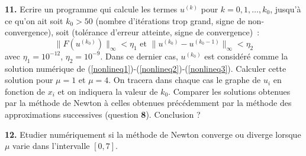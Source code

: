 \documentclass[a4paper,10pt]{article}
\begin{document}
\vspace{1ex}

\noindent
{\bf 11.} Ecrire un programme qui calcule les termes $u^{(k)}$ pour $k=0,1,\ldots , k_0$, jusqu'\`a ce qu'on ait soit $k_0 > 50$ 
(nombre d'it\'erations trop grand, signe de non-convergence), soit (tol\'erance d'erreur atteinte, signe de convergence)~:
$$
\| F(u^{(k_0)})   \|_\infty < \eta_1
 \mbox{~et~} \| u^{(k_0)} - u^{(k_0 -1)} \|_\infty < \eta_2
$$
avec $\eta_1 = 10^{-12}$, $\eta_2 = 10^{-9}$.
Dans ce dernier cas, $u^{(k_0)}$ est consid\'er\'e comme la solution num\'erique de (\ref{nonlineq1})-(\ref{nonlineq2})-(\ref{nonlineq3}).
Calculer cette solution pour $\mu =1$ et $\mu =4$.
On tracera dans chaque cas le graphe de $u_i$ en fonction de $x_i$
et on indiquera la valeur de $k_0$. 
Comparer les solutions obtenues par la m\'ethode de Newton \`a celles obtenues
pr\'ec\'edemment par la m\'ethode des approximations successives (question {\bf 8}).
Conclusion ?

\vspace{1ex}

\noindent
{\bf 12.} Etudier num\'eriquement si la m\'ethode de Newton converge ou diverge lorsque $\mu$ varie dans l'intervalle $[0,7]$.
\end{document}
